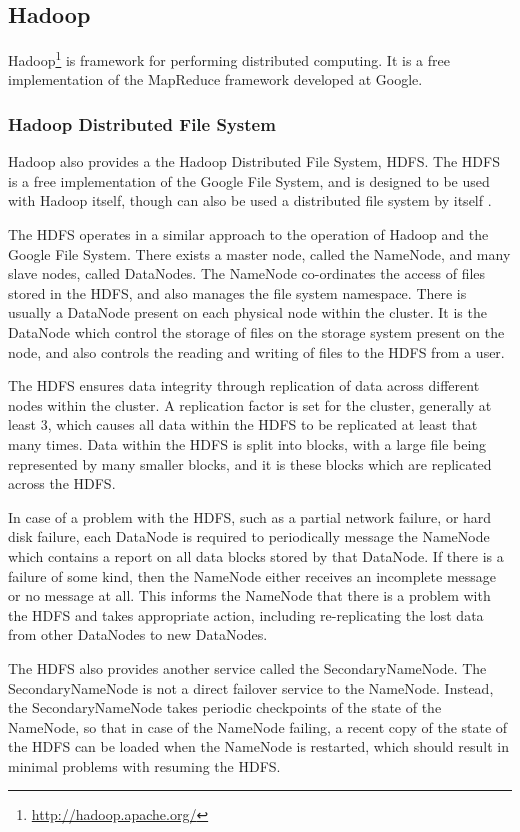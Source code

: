 \subsection{Hadoop}
Hadoop\footnote{\url{http://hadoop.apache.org/}} is framework for performing distributed computing. It is a free implementation of the MapReduce framework developed at Google.

\subsubsection{Hadoop Distributed File System}
Hadoop also provides a the Hadoop Distributed File System, HDFS. The HDFS is a free implementation of the Google File System, and is designed to be used with Hadoop itself, though can also be used a distributed file system by itself \cite{hdfs}.

The HDFS operates in a similar approach to the operation of Hadoop and the Google File System. There exists a master node, called the NameNode, and many slave nodes, called DataNodes. The NameNode co-ordinates the access of files stored in the HDFS, and also manages the file system namespace. There is usually a DataNode present on each physical node within the cluster. It is the DataNode which control the storage of files on the storage system present on the node, and also controls the reading and writing of files to the HDFS from a user.

The HDFS ensures data integrity through replication of data across different nodes within the cluster. A replication factor is set for the cluster, generally at least 3, which causes all data within the HDFS to be replicated at least that many times. Data within the HDFS is split into blocks, with a large file being represented by many smaller blocks, and it is these blocks which are replicated across the HDFS.

In case of a problem with the HDFS, such as a partial network failure, or hard disk failure, each DataNode is required to periodically message the NameNode which contains a report on all data blocks stored by that DataNode. If there is a failure of some kind, then the NameNode either receives an incomplete message or no message at all. This informs the NameNode that there is a problem with the HDFS and takes appropriate action, including re-replicating the lost data from other DataNodes to new DataNodes.

The HDFS also provides another service called the SecondaryNameNode. The SecondaryNameNode is not a direct failover service to the NameNode. Instead, the SecondaryNameNode takes periodic checkpoints of the state of the NameNode, so that in case of the NameNode failing, a recent copy of the state of the HDFS can be loaded when the NameNode is restarted, which should result in minimal problems with resuming the HDFS.